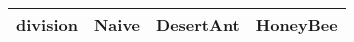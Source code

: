 \begin{tabular} {|l|l|l|l|}
\hline
division & Naive & DesertAnt & HoneyBee \\
\hline
\hline
\end{tabular}
